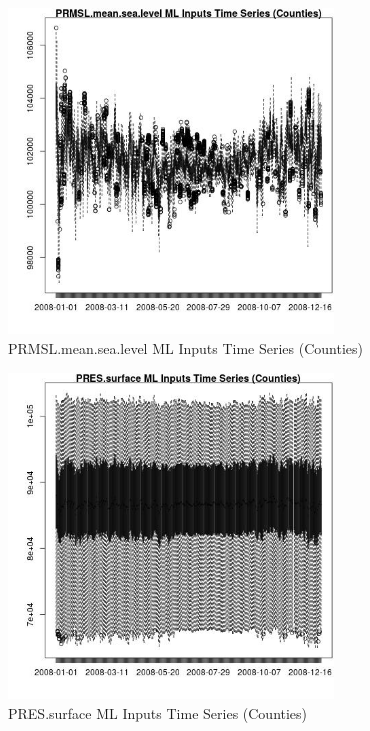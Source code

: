 \begin{figure} 
\centering  
\includegraphics[width=0.77\textwidth]{Code_Outputs/ML_input_report_ML_input_CountyGeometricCentroids_Locations_Dates_part_c_2008-01-01to2008-12-31_PRMSL.mean.sea.levelTS.jpg} 
\caption{\label{fig:ML_input_report_ML_input_CountyGeometricCentroids_Locations_Dates_part_c_2008-01-01to2008-12-31PRMSL.mean.sea.levelTS}PRMSL.mean.sea.level ML Inputs Time Series (Counties)} 
\end{figure} 
 

\begin{figure} 
\centering  
\includegraphics[width=0.77\textwidth]{Code_Outputs/ML_input_report_ML_input_CountyGeometricCentroids_Locations_Dates_part_c_2008-01-01to2008-12-31_PRES.surfaceTS.jpg} 
\caption{\label{fig:ML_input_report_ML_input_CountyGeometricCentroids_Locations_Dates_part_c_2008-01-01to2008-12-31PRES.surfaceTS}PRES.surface ML Inputs Time Series (Counties)} 
\end{figure} 
 

